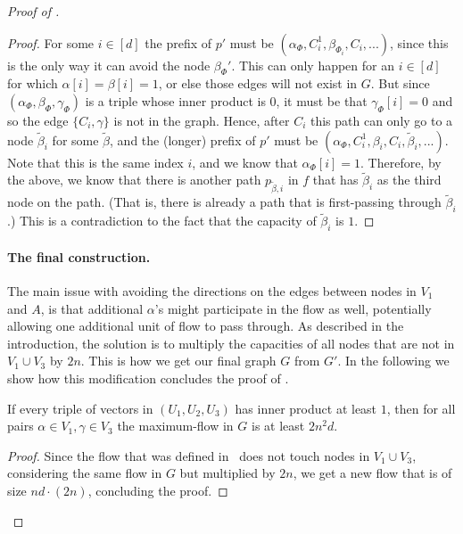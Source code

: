 \begin{proof}[Proof of ]
\begin{proof}
For some $i\in [d]$ the prefix of $p'$ must be $(\alpha_{\Phi}, C_i^1, \beta_{\Phi_i}, C_i,...)$, since this is the only way it can avoid the node ${\beta_{\Phi}}'$.
This can only happen for an $i \in [d]$ for which $\alpha[i]=\beta[i]=1$, or else those edges will not exist in $G$.
But since $(\alpha_{\Phi}, \beta_{\Phi}, \gamma_{\Phi})$ is a triple whose inner product is $0$, it must be that $\gamma_{\Phi} [i]=0$ and so the edge $\{C_i,\gamma\}$ is not in the graph.
%
Hence, after $C_i$ this path can only go to a node $\widetilde{\beta}_i$ for some $\widetilde{\beta}$, and the (longer) prefix of $p'$ must be $(\alpha_{\Phi}, C_i^1, \beta_i, C_i, {\widetilde{\beta}}_i ,...)$.
Note that this is the same index $i$, and we know that $\alpha_{\Phi} [i] =1$.
Therefore, by the above, we know that there is another path $p_{\widetilde{\beta},i}$ in $f$ that has ${\widetilde{\beta}}_i$ as the third node on the path.
(That is, there is already a path that is first-passing through ${\widetilde{\beta}}_i$.)
This is a contradiction to the fact that the capacity of ${\widetilde{\beta}}_i$ is $1$.
\end{proof}


\paragraph{The final construction.}

The main issue with avoiding the directions on the edges between nodes in $V_1$ and $A$, is that additional $\alpha$'s might participate in the flow as well, potentially allowing one additional unit of flow to pass through. As described in the introduction, the solution is to multiply the capacities of all nodes that are not in $V_1\cup V_3$ by $2n$. This is how we get our final graph $G$ from $G'$.
In the following we show how this modification concludes the proof of .


\begin{claim}\label{claim:first}
If every triple of vectors in $(U_1, U_2, U_3)$ has inner product at least $1$, then for all pairs $\alpha \in V_1,\gamma \in V_3$ the maximum-flow in $G$ is at least $2n^2d$.
\end{claim}
\begin{proof}
Since the flow that was defined in~ does not touch nodes in $V_1\cup V_3$, considering the same flow in $G$ but multiplied by $2n$, we get a new flow that is of size $nd\cdot(2n)$, concluding the proof.
\end{proof}


\end{proof}
